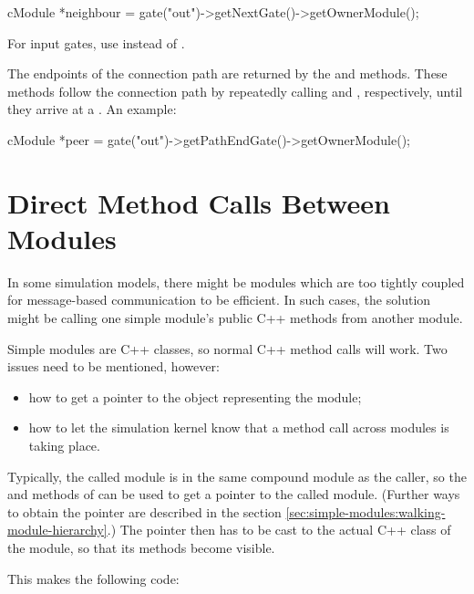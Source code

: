 \begin{ned}
\begin{cpp}
cModule *neighbour = gate("out")->getNextGate()->getOwnerModule();
\end{cpp}

For input gates, use  instead of .

The endpoints of the connection path are returned by the
 and  
methods. These methods follow the connection path by repeatedly calling
 and , respectively,
until they arrive at a . An example:

\begin{cpp}
cModule *peer = gate("out")->getPathEndGate()->getOwnerModule();
\end{cpp}


\section{Direct Method Calls Between Modules}
\label{sec:simple-modules:direct-method-calls}

In some simulation models, there might be modules which are too
tightly coupled for message-based communication to be efficient.
In such cases, the solution might be calling one simple module's public
C++ methods from another module.

Simple modules are C++ classes, so normal C++ method calls will
work. Two issues need to be mentioned, however:

\begin{itemize}
  \item how to get a pointer to the object representing the module;
  \item how to let the simulation kernel know that a method call across modules
     is taking place.
\end{itemize}

Typically, the called module is in the same compound module as the caller,
so the  and  methods of
 can be used to get a  pointer to the
called module. (Further ways to obtain the pointer are described
in the section \ref{sec:simple-modules:walking-module-hierarchy}.)
The  pointer then has to be cast to the actual C++ class
of the module, so that its methods become visible.

This makes the following code:


\end{ned}
